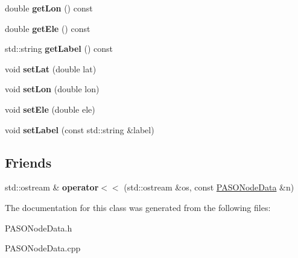 \begin{DoxyCompactItemize}
\item 
\hypertarget{class_p_a_s_o_node_data_a903619a5b3538226ebcbae29a62fedb7}{}double {\bfseries get\+Lon} () const \label{class_p_a_s_o_node_data_a903619a5b3538226ebcbae29a62fedb7}

\item 
\hypertarget{class_p_a_s_o_node_data_acf5f37c1328f27858b5f74ee48fc4f5e}{}double {\bfseries get\+Ele} () const \label{class_p_a_s_o_node_data_acf5f37c1328f27858b5f74ee48fc4f5e}

\item 
\hypertarget{class_p_a_s_o_node_data_a987be9604adbc064ece90fbab3c6b2fb}{}std\+::string {\bfseries get\+Label} () const \label{class_p_a_s_o_node_data_a987be9604adbc064ece90fbab3c6b2fb}

\item 
\hypertarget{class_p_a_s_o_node_data_a7316aaeee9e46d12e39d4be0251643bc}{}void {\bfseries set\+Lat} (double lat)\label{class_p_a_s_o_node_data_a7316aaeee9e46d12e39d4be0251643bc}

\item 
\hypertarget{class_p_a_s_o_node_data_ade9075faefd772a7ab6442ec84a1a716}{}void {\bfseries set\+Lon} (double lon)\label{class_p_a_s_o_node_data_ade9075faefd772a7ab6442ec84a1a716}

\item 
\hypertarget{class_p_a_s_o_node_data_a72ebb7f01831c5723095673600eaf1f4}{}void {\bfseries set\+Ele} (double ele)\label{class_p_a_s_o_node_data_a72ebb7f01831c5723095673600eaf1f4}

\item 
\hypertarget{class_p_a_s_o_node_data_a4c35b414a38cfd9375938802bda6b11c}{}void {\bfseries set\+Label} (const std\+::string \&label)\label{class_p_a_s_o_node_data_a4c35b414a38cfd9375938802bda6b11c}

\end{DoxyCompactItemize}
\subsection*{Friends}
\begin{DoxyCompactItemize}
\item 
\hypertarget{class_p_a_s_o_node_data_a9892149a671ef201b90b9a0a45c60999}{}std\+::ostream \& {\bfseries operator$<$$<$} (std\+::ostream \&os, const \hyperlink{class_p_a_s_o_node_data}{P\+A\+S\+O\+Node\+Data} \&n)\label{class_p_a_s_o_node_data_a9892149a671ef201b90b9a0a45c60999}

\end{DoxyCompactItemize}


The documentation for this class was generated from the following files\+:\begin{DoxyCompactItemize}
\item 
P\+A\+S\+O\+Node\+Data.\+h\item 
P\+A\+S\+O\+Node\+Data.\+cpp\end{DoxyCompactItemize}
